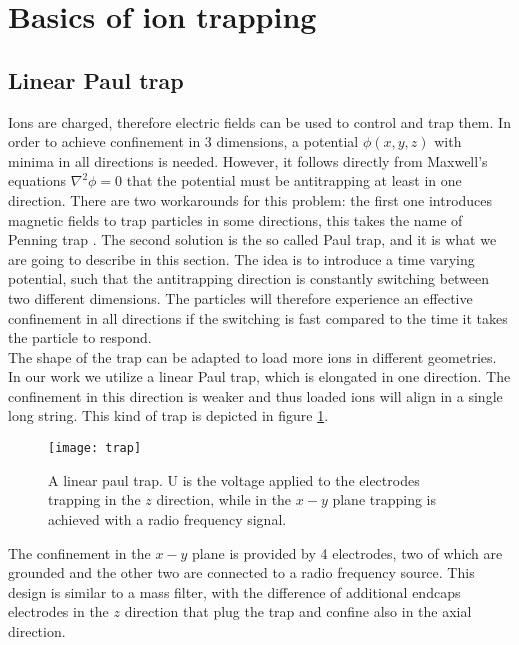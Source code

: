 
\section{Basics of ion trapping}
\subsection{Linear Paul trap}
Ions are charged, therefore electric fields can be used to control and trap them. In order to achieve confinement in 3 dimensions, a potential $\phi(x,y,z)$ with minima in all directions is needed. However, it follows directly from Maxwell's equations $\nabla^2 \phi = 0$ that the potential must be antitrapping at least in one direction. There are two workarounds for this problem: the first one introduces magnetic fields to trap particles in some directions, this takes the name of Penning trap \cite{RevModPhys.58.233}. The second solution is the so called Paul trap, and it is what we are going to describe in this section. The idea is to introduce a time varying potential, such that the antitrapping direction is constantly switching between two different dimensions. The particles will therefore experience an effective confinement in all directions if the switching is fast compared to the time it takes the particle to respond.\\
The shape of the trap can be adapted to load more ions in different geometries. In our work we utilize a linear Paul trap, which is elongated in one direction. The confinement in this direction is weaker and thus loaded ions will align in a single long string. This kind of trap is depicted in figure \ref{trap}.
\begin{figure}
\centering
\texttt{[image: trap]}
\caption{A linear paul trap. U is the voltage applied to the electrodes trapping in the $z$ direction, while in the $x-y$ plane trapping is achieved with a radio frequency signal.}
\label{trap}
\end{figure}
The confinement in the $x-y$ plane is provided by 4 electrodes, two of which are grounded and the other two are connected to a radio frequency source. This design is similar to a mass filter, with the difference of additional endcaps electrodes in the $z$ direction that plug the trap and confine also in the axial direction.\\
